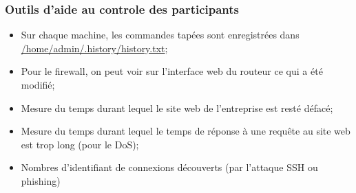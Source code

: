 \documentclass{beamer}
\begin{document}
		\begin{frame}
			\frametitle{Outils d'aide au controle des participants}
			\begin{itemize}
				\item Sur chaque machine, les commandes tapées sont enregistrées dans \url{/home/admin/.history/history.txt};
				\item Pour le firewall, on peut voir sur l'interface web du routeur ce qui a été modifié;
				\item Mesure du temps durant lequel le site web de l'entreprise est resté défacé;
				\item Mesure du temps durant lequel le temps de réponse à une requête au site web est trop long (pour le DoS);
				\item Nombres d'identifiant de connexions découverts (par l'attaque SSH ou phishing)
			\end{itemize}
		\end{frame}
\end{document}
